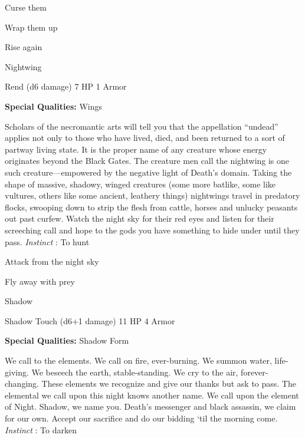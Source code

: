 \startitemize[1,packed]

\item Curse them

 
\item Wrap them up

 
\item Rise again


\stopitemize
 
\startMonsterName
Nightwing	 
\stopMonsterName
 

Rend (d6 damage)	7 HP	1 Armor

 


 
\startMonsterQualities
{\bf Special Qualities:}  Wings
\stopMonsterQualities
 
\startMonsterDescription
Scholars of the necromantic arts will tell you that the appellation “undead” applies not only to those who have lived, died, and been returned to a sort of partway living state.  It is the proper name of any creature whose energy originates beyond the Black Gates.  The creature men call the nightwing is one such creature—empowered by the negative light of Death’s domain.  Taking the shape of massive, shadowy, winged creatures (some more batlike, some like vultures, others like some ancient, leathery things) nightwings travel in predatory flocks, swooping down to strip the flesh from cattle, horses and unlucky peasants out past curfew.  Watch the night sky for their red eyes and listen for their screeching call and hope to the gods you have something to hide under until they pass. {\em Instinct} : To hunt
\stopMonsterDescription
 
\startitemize[1,packed]

\item Attack from the night sky

 
\item Fly away with prey


\stopitemize
 
\startMonsterName
Shadow	 
\stopMonsterName
 

Shadow Touch (d6+1 damage)	11 HP	4 Armor

 


 
\startMonsterQualities
{\bf Special Qualities:}  Shadow Form
\stopMonsterQualities
 
\startMonsterDescription
We call to the elements.  We call on fire, ever-burning.  We summon water, life-giving.  We beseech the earth, stable-standing.  We cry to the air, forever-changing.  These elements we recognize and give our thanks but ask to pass.  The elemental we call upon this night knows another name.  We call upon the element of Night.  Shadow, we name you.  Death’s messenger and black assassin, we claim for our own.  Accept our sacrifice and do our bidding ‘til the morning come. {\em Instinct} : To darken
\stopMonsterDescription
 
